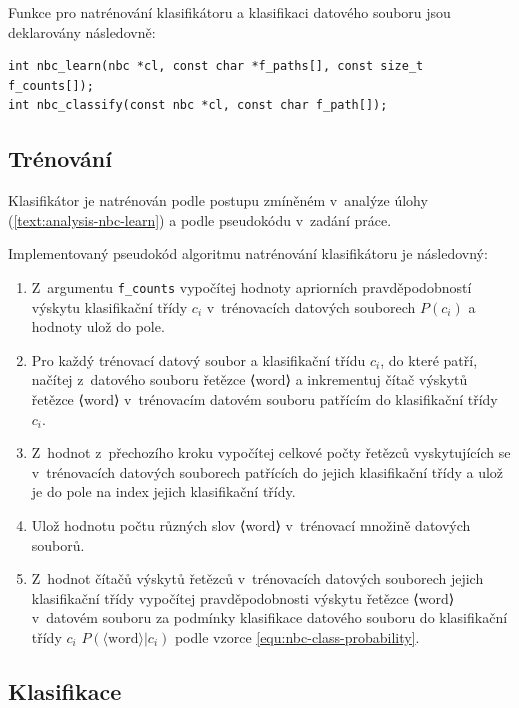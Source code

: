 \documentclass[a4paper, 12pt]{report}
\begin{document}
Funkce pro natrénování klasifikátoru a klasifikaci datového souboru jsou 
deklarovány následovně:

\begin{lstlisting}
int nbc_learn(nbc *cl, const char *f_paths[], const size_t f_counts[]);
int nbc_classify(const nbc *cl, const char f_path[]);
\end{lstlisting}

\subsection{Trénování}

Klasifikátor je natrénován podle postupu zmíněném v~analýze úlohy 
(\ref{text:analysis-nbc-learn}) a podle pseudokódu v~zadání práce.

Implementovaný pseudokód algoritmu natrénování klasifikátoru je 
následovný:

\begin{enumerate}
    \item Z~argumentu \texttt{f\_counts} vypočítej hodnoty apriorních 
pravděpodobností výskytu klasifikační třídy $c_i$ v~trénovacích datových 
souborech $P(c_i)$ a hodnoty ulož do pole.

    \item Pro každý trénovací datový soubor a klasifikační třídu $c_i$, do 
které patří, načítej z~datového souboru řetězce ⟨word⟩ a inkrementuj čítač 
výskytů řetězce ⟨word⟩ v~trénovacím datovém souboru patřícím do 
klasifikační třídy $c_i$.

    \item Z~hodnot z~přechozího kroku vypočítej celkové počty řetězců 
vyskytujících se v~trénovacích datových souborech patřících do jejich 
klasifikační třídy a ulož je do pole na index jejich klasifikační třídy.

    \item Ulož hodnotu počtu různých slov ⟨word⟩ v~trénovací množině 
datových souborů.

    \item Z~hodnot čítačů výskytů řetězců v~trénovacích datových souborech 
jejich klasifikační třídy vypočítej pravděpodobnosti výskytu řetězce  
⟨word⟩ v~datovém souboru za podmínky klasifikace datového souboru do 
klasifikační třídy $c_i$ $P(\langle \text{word} \rangle|c_i)$ podle vzorce 
\ref{equ:nbc-class-probability}.
\end{enumerate}

\subsection{Klasifikace}
\end{document}

